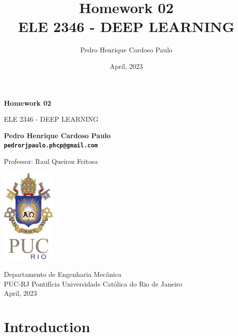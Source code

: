 \documentclass[10pt, a4paper]{article}
\begin{document}
\def\TITLE{Homework 02}
\def\DISCIPLINE{ELE 2346 - DEEP LEARNING}
\def\PROFESSOR{Raul Queiroz Feitosa}
\def\AUTHOR{Pedro Henrique Cardoso Paulo}
\def\CONTACT{pedrorjpaulo.phcp@gmail.com}
\def\DATE{April, 2023}

\title{\textbf{\TITLE} \\ \DISCIPLINE}
\author{\AUTHOR}
\date{\DATE}

\begin{titlepage}
      \begin{center}
          \vspace*{1cm}

          \Huge
          \textbf{\TITLE}

          \vspace{0.5cm}
          \LARGE
          \DISCIPLINE

          \vspace{1.5cm}

          \textbf{\AUTHOR \\ {\tt \CONTACT}}

          \vfill
          Professor: \PROFESSOR

          \vspace{0.8cm}

          \includegraphics[width=0.2\textwidth]{../general/puc.jpg}

          \Large
          Departamento de Engenharia Mecânica\\
          PUC-RJ Pontifícia Universidade Católica do Rio de Janeiro\\
          \DATE

      \end{center}
  \end{titlepage}

\maketitle

\section{Introduction}
\end{document}
